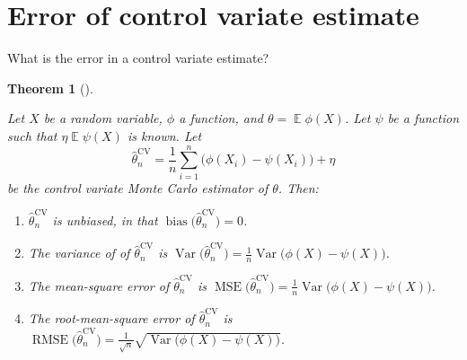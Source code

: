 \documentclass[
  letterpaper,
  DIV=11,
  numbers=noendperiod]{scrreprt}
\newcommand{\Exg}{\operatorname{\mathbb{E}}}
\theoremstyle{plain}
\newtheorem{theorem}{Theorem}[chapter]
\theoremstyle{definition}
\theoremstyle{definition}
\theoremstyle{remark}
\begin{document}
\section{Error of control variate
estimate}\label{error-of-control-variate-estimate}

What is the error in a control variate estimate?

\begin{theorem}[]\protect\hypertarget{thm-CVerr}{}\label{thm-CVerr}

Let \(X\) be a random variable, \(\phi\) a function, and
\(\theta = \Exg\phi(X)\). Let \(\psi\) be a function such that
\(\eta \Exg\psi(X)\) is known. Let
\[ \widehat{\theta}_n^{\mathrm{CV}} = \frac{1}{n} \sum_{i=1}^n \big(\phi(X_i) - \psi(X_i)\big) + \eta\]
be the control variate Monte Carlo estimator of \(\theta\). Then:

\begin{enumerate}
\def\labelenumi{\arabic{enumi}.}
\item
  \(\widehat{\theta}_n^{\mathrm{CV}}\) is unbiased, in that
  \(\operatorname{bias}\big(\widehat{\theta}_n^{\mathrm{CV}}\big) = 0\).
\item
  The variance of of \(\widehat{\theta}_n^{\mathrm{CV}}\) is
  \({\displaystyle \operatorname{Var}\big(\widehat{\theta}_n^{\mathrm{CV}}\big) = \frac{1}{n} \operatorname{Var}\big(\phi(X) - \psi(X)\big)}\).
\item
  The mean-square error of \(\widehat{\theta}_n^{\mathrm{CV}}\) is
  \({\displaystyle \operatorname{MSE}\big(\widehat{\theta}_n^{\mathrm{CV}}\big) = \frac{1}{n} \operatorname{Var}\big(\phi(X) - \psi(X)\big)}\).
\item
  The root-mean-square error of \(\widehat{\theta}_n^{\mathrm{CV}}\) is
  \({\displaystyle \operatorname{RMSE}\big(\widehat{\theta}_n^{\mathrm{CV}}\big) = \frac{1}{\sqrt{n}} \sqrt{\operatorname{Var}\big(\phi(X) - \psi(X)\big)}}\).
\end{enumerate}

\end{theorem}
\end{document}
